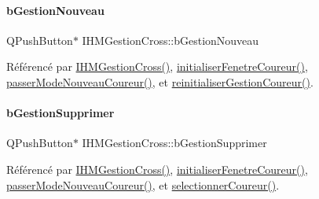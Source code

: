\mbox{\label{class_i_h_m_gestion_cross_ab987235a79961d3d186878052a02b21b}} 
\paragraph{\texorpdfstring{b\+Gestion\+Nouveau}{bGestionNouveau}}
{\footnotesize\ttfamily Q\+Push\+Button$\ast$ I\+H\+M\+Gestion\+Cross\+::b\+Gestion\+Nouveau\hspace{0.3cm}{\ttfamily [private]}}



Référencé par \hyperlink{class_i_h_m_gestion_cross_a2c62fd83326a87456a403f46acc408c8}{I\+H\+M\+Gestion\+Cross()}, \hyperlink{class_i_h_m_gestion_cross_aa5d9de499a66e52b843c4ef4c6074a60}{initialiser\+Fenetre\+Coureur()}, \hyperlink{class_i_h_m_gestion_cross_ac8f336c95a5f0c9eb8a4bc1c4bb83445}{passer\+Mode\+Nouveau\+Coureur()}, et \hyperlink{class_i_h_m_gestion_cross_a85c44933ec0dcbb591e01c832063367e}{reinitialiser\+Gestion\+Coureur()}.

\mbox{\label{class_i_h_m_gestion_cross_adc5bed6caf7f597dd30999bc871e695b}} 
\paragraph{\texorpdfstring{b\+Gestion\+Supprimer}{bGestionSupprimer}}
{\footnotesize\ttfamily Q\+Push\+Button$\ast$ I\+H\+M\+Gestion\+Cross\+::b\+Gestion\+Supprimer\hspace{0.3cm}{\ttfamily [private]}}



Référencé par \hyperlink{class_i_h_m_gestion_cross_a2c62fd83326a87456a403f46acc408c8}{I\+H\+M\+Gestion\+Cross()}, \hyperlink{class_i_h_m_gestion_cross_aa5d9de499a66e52b843c4ef4c6074a60}{initialiser\+Fenetre\+Coureur()}, \hyperlink{class_i_h_m_gestion_cross_ac8f336c95a5f0c9eb8a4bc1c4bb83445}{passer\+Mode\+Nouveau\+Coureur()}, et \hyperlink{class_i_h_m_gestion_cross_ad71963d500fd61995fdae94e833db163}{selectionner\+Coureur()}.

